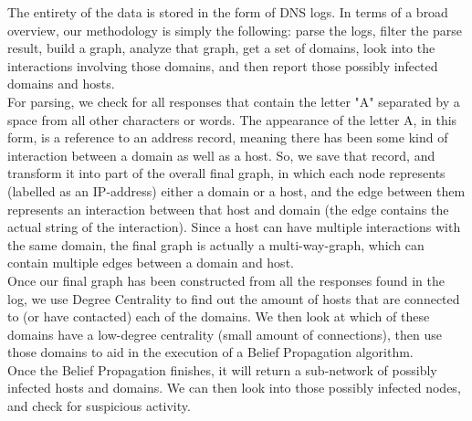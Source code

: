 \documentclass{article} %
\begin{document}
The entirety of the data is stored in the form of DNS logs. In terms of a broad overview, our methodology is simply the following: parse the logs, filter the parse result, build a graph, analyze that graph, get a set of domains,
look into the interactions involving those domains, and then report those possibly infected domains and hosts. \\
For parsing, we check for all responses that contain the letter "A" separated by a space from all other characters or words. The appearance of the letter A, in this form, is a reference to an address record, meaning 
there has been some kind of interaction between a domain as well as a host. So, we save that record, and transform it into part of the overall final graph, in which each node represents (labelled as an IP-address) either a domain or a host,
and the edge between them represents an interaction between that host and domain (the edge contains the actual string of the interaction). Since a host can have multiple interactions with the same domain, the final graph
is actually a multi-way-graph, which can contain multiple edges between a domain and host. \\
Once our final graph has been constructed from all the responses found in the log, we use Degree Centrality to find out the amount of hosts that
are connected to (or have contacted) each of the domains. We then look at which of these domains have a low-degree centrality (small amount of connections), then use those domains to aid in the execution of a Belief Propagation algorithm. \\
Once the Belief Propagation finishes, it will return a sub-network of possibly infected hosts and domains. We can then look into those possibly infected nodes, and check for suspicious activity. 
\end{document}
